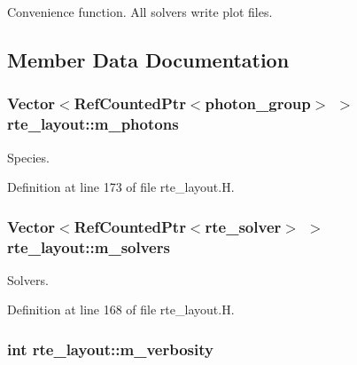 Convenience function. All solvers write plot files. 



\subsection{Member Data Documentation}
\subsubsection[{\texorpdfstring{m\+\_\+photons}{m_photons}}]{\setlength{\rightskip}{0pt plus 5cm}Vector$<$Ref\+Counted\+Ptr$<${\bf photon\+\_\+group}$>$ $>$ rte\+\_\+layout\+::m\+\_\+photons\hspace{0.3cm}{\ttfamily [protected]}}\hypertarget{classrte__layout_ad135565a4250d1927706eea59b1fbb2b}{}\label{classrte__layout_ad135565a4250d1927706eea59b1fbb2b}


Species. 



Definition at line 173 of file rte\+\_\+layout.\+H.

\subsubsection[{\texorpdfstring{m\+\_\+solvers}{m_solvers}}]{\setlength{\rightskip}{0pt plus 5cm}Vector$<$Ref\+Counted\+Ptr$<${\bf rte\+\_\+solver}$>$ $>$ rte\+\_\+layout\+::m\+\_\+solvers\hspace{0.3cm}{\ttfamily [protected]}}\hypertarget{classrte__layout_a200d9f1d395d696976db41beaaa9cbba}{}\label{classrte__layout_a200d9f1d395d696976db41beaaa9cbba}


Solvers. 



Definition at line 168 of file rte\+\_\+layout.\+H.

\subsubsection[{\texorpdfstring{m\+\_\+verbosity}{m_verbosity}}]{\setlength{\rightskip}{0pt plus 5cm}int rte\+\_\+layout\+::m\+\_\+verbosity\hspace{0.3cm}{\ttfamily [protected]}}\hypertarget{classrte__layout_a4cd602a444d5ac329f12e6ccad4c401f}{}\label{classrte__layout_a4cd602a444d5ac329f12e6ccad4c401f}


